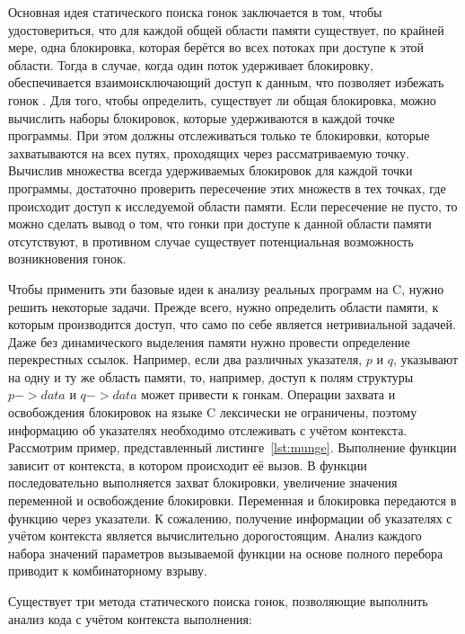Основная идея статического поиска гонок заключается в том, чтобы удостовериться, что для каждой общей области памяти существует, по крайней мере, одна блокировка, которая берётся во всех потоках при доступе к этой области. Тогда в случае, когда один поток удерживает блокировку, обеспечивается взаимоисключающий доступ к данным, что позволяет избежать гонок \cite{Vojdani}. Для того, чтобы определить, существует ли общая блокировка, можно вычислить наборы блокировок, которые удерживаются в каждой точке программы. При этом должны отслеживаться только те блокировки, которые захватываются на всех путях, проходящих через рассматриваемую точку. Вычислив множества всегда удерживаемых блокировок для каждой точки программы, достаточно проверить пересечение этих множеств в тех точках, где происходит доступ к исследуемой области памяти. Если пересечение не пусто, то можно сделать вывод о том, что гонки при доступе к данной области памяти отсутствуют, в противном случае существует потенциальная возможность возникновения гонок.

Чтобы применить эти базовые идеи к анализу реальных программ на C, нужно решить некоторые задачи. Прежде всего, нужно определить области памяти, к которым производится доступ, что само по себе является нетривиальной задачей. Даже без динамического выделения памяти нужно провести определение перекрестных ссылок. Например, если два различных указателя, $p$ и $q$, указывают на одну и ту же область памяти, то, например, доступ к полям структуры $p->data$ и $q->data$ может привести к гонкам. Операции захвата и освобождения блокировок на языке C лексически не ограничены, поэтому информацию об указателях необходимо отслеживать с учётом контекста. Рассмотрим пример, представленный листинге~\ref{lst:munge}. Выполнение функции  зависит от контекста, в котором происходит её вызов. В функции последовательно выполняется захват блокировки, увеличение значения переменной и освобождение блокировки. Переменная и блокировка передаются в функцию через указатели. К сожалению, получение информации об указателях с учётом контекста является вычислительно дорогостоящим. Анализ каждого набора значений параметров вызываемой функции на основе полного перебора приводит к комбинаторному взрыву.



Существует три метода статического поиска гонок, позволяющие выполнить анализ кода с учётом контекста выполнения:

